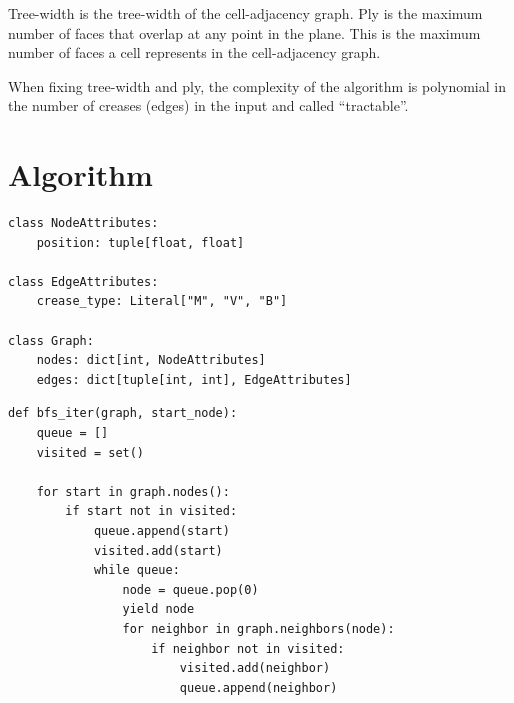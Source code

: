 Tree-width is the tree-width of the cell-adjacency graph.
Ply is the maximum number of faces that overlap at any point in the plane.
This is the maximum number of faces a cell represents in the cell-adjacency graph.

When fixing tree-width and ply, the complexity of the algorithm is polynomial in the number of creases (edges) in the input and called ``tractable''.


\chapter{Algorithm}

\begin{lstlisting}
class NodeAttributes:
    position: tuple[float, float]

class EdgeAttributes:
    crease_type: Literal["M", "V", "B"]

class Graph:
    nodes: dict[int, NodeAttributes]
    edges: dict[tuple[int, int], EdgeAttributes]
\end{lstlisting}

\begin{lstlisting}
def bfs_iter(graph, start_node):
    queue = []
    visited = set()

    for start in graph.nodes():
        if start not in visited:
            queue.append(start)
            visited.add(start)
            while queue:
                node = queue.pop(0)
                yield node
                for neighbor in graph.neighbors(node):
                    if neighbor not in visited:
                        visited.add(neighbor)
                        queue.append(neighbor)
\end{lstlisting}
